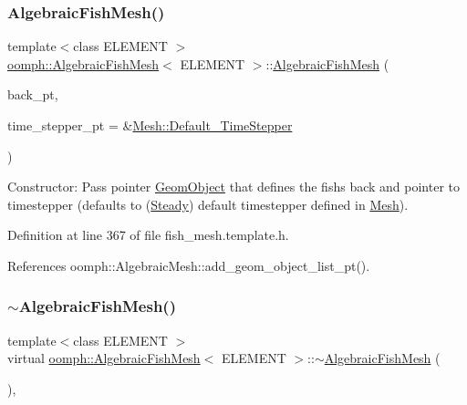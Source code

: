 \subsubsection{\texorpdfstring{Algebraic\+Fish\+Mesh()}{AlgebraicFishMesh()}\hspace{0.1cm}{\footnotesize\ttfamily [2/2]}}
{\footnotesize\ttfamily template$<$class E\+L\+E\+M\+E\+NT $>$ \\
\hyperlink{classoomph_1_1AlgebraicFishMesh}{oomph\+::\+Algebraic\+Fish\+Mesh}$<$ E\+L\+E\+M\+E\+NT $>$\+::\hyperlink{classoomph_1_1AlgebraicFishMesh}{Algebraic\+Fish\+Mesh} (\begin{DoxyParamCaption}\item[{\hyperlink{classoomph_1_1GeomObject}{Geom\+Object} $\ast$}]{back\+\_\+pt,  }\item[{\hyperlink{classoomph_1_1TimeStepper}{Time\+Stepper} $\ast$}]{time\+\_\+stepper\+\_\+pt = {\ttfamily \&\hyperlink{classoomph_1_1Mesh_a12243d0fee2b1fcee729ee5a4777ea10}{Mesh\+::\+Default\+\_\+\+Time\+Stepper}} }\end{DoxyParamCaption})\hspace{0.3cm}{\ttfamily [inline]}}



Constructor\+: Pass pointer \hyperlink{classoomph_1_1GeomObject}{Geom\+Object} that defines the fish\textquotesingle{}s back and pointer to timestepper (defaults to (\hyperlink{classoomph_1_1Steady}{Steady}) default timestepper defined in \hyperlink{classoomph_1_1Mesh}{Mesh}). 



Definition at line 367 of file fish\+\_\+mesh.\+template.\+h.



References oomph\+::\+Algebraic\+Mesh\+::add\+\_\+geom\+\_\+object\+\_\+list\+\_\+pt().

\mbox{\label{classoomph_1_1AlgebraicFishMesh_a027d54d158e22ce8fe3c1246cb030440}} 
\subsubsection{\texorpdfstring{$\sim$\+Algebraic\+Fish\+Mesh()}{~AlgebraicFishMesh()}}
{\footnotesize\ttfamily template$<$class E\+L\+E\+M\+E\+NT $>$ \\
virtual \hyperlink{classoomph_1_1AlgebraicFishMesh}{oomph\+::\+Algebraic\+Fish\+Mesh}$<$ E\+L\+E\+M\+E\+NT $>$\+::$\sim$\hyperlink{classoomph_1_1AlgebraicFishMesh}{Algebraic\+Fish\+Mesh} (\begin{DoxyParamCaption}{ }\end{DoxyParamCaption})\hspace{0.3cm}{\ttfamily [inline]}, {\ttfamily [virtual]}}



